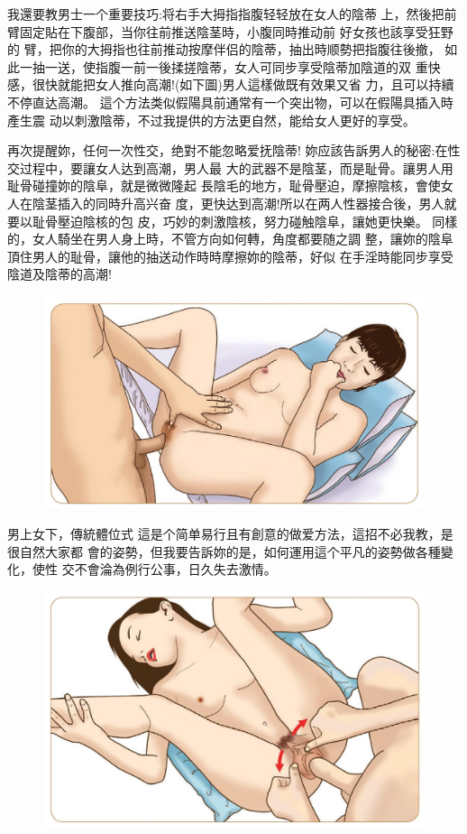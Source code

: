 \documentclass[12pt,UTF8]{ctexbook}
\begin{document}
我還要教男士一个重要技巧:将右手大拇指指腹轻轻放在女人的陰蒂
上，然後把前臂固定貼在下腹部，当你往前推送陰茎時，小腹同時推动前
好女孩也該享受狂野的
臂，把你的大拇指也往前推动按摩伴侣的陰蒂，抽出時顺勢把指腹往後撤，
如此一抽一送，使指腹一前一後揉搓陰蒂，女人可同步享受陰蒂加陰道的双
重快感，很快就能把女人推向高潮!(如下圖)男人這樣做既有效果又省
力，且可以持續不停直达高潮。
這个方法类似假陽具前通常有一个突出物，可以在假陽具插入時產生震
动以刺激陰蒂，不过我提供的方法更自然，能给女人更好的享受。

再次提醒妳，任何一次性交，绝對不能忽略爱抚陰蒂!
妳应該告訴男人的秘密:在性交过程中，要讓女人达到高潮，男人最
大的武器不是陰茎，而是耻骨。讓男人用耻骨碰撞妳的陰阜，就是微微隆起
長陰毛的地方，耻骨壓迫，摩擦陰核，會使女人在陰茎插入的同時升高兴奋
度，更快达到高潮!所以在两人性器接合後，男人就要以耻骨壓迫陰核的包
皮，巧妙的刺激陰核，努力碰触陰阜，讓她更快樂。
同樣的，女人騎坐在男人身上時，不管方向如何轉，角度都要随之調
整，讓妳的陰阜頂住男人的耻骨，讓他的抽送动作時時摩擦妳的陰蒂，好似
在手淫時能同步享受陰道及陰蒂的高潮!

\begin{figure}[htbp]
	\centering
	\includegraphics[width=0.7\linewidth]{27}
	\caption{}
	\label{fig:1}
\end{figure}

男上女下，傳統體位式
這是个简单易行且有創意的做爱方法，這招不必我教，是很自然大家都
會的姿勢，但我要告訴妳的是，如何運用這个平凡的姿勢做各種變化，使性
交不會淪為例行公事，日久失去激情。

\begin{figure}[htbp]
	\centering
	\includegraphics[width=0.7\linewidth]{28}
	\caption{}
	\label{fig:1}
\end{figure}
\end{document}
